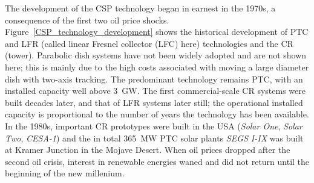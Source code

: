 The development of the \ac{CSP} technology began in earnest in the 1970s, a consequence of the first two oil price shocks. Figure~\ref{CSP_technology_development} shows the historical development of \ac{PTC} and \ac{LFR} (called linear Fresnel collector (LFC) here) technologies and the \ac{CR} (tower). Parabolic dish systems have not been widely adopted and are not shown here; this is mainly due to the high costs associated with moving a large diameter dish with two-axis tracking. The predominant technology remains \ac{PTC}, with an installed capacity well above \SI{3}{GW}. The first commercial-scale \ac{CR} systems were built decades later, and that of \ac{LFR} systems later still; the operational installed capacity is proportional to the number of years the technology has been available. In the 1980s, important \ac{CR} prototypes were built in the USA (\emph{Solar One}, \emph{Solar Two}, \emph{CESA-1}) and the in total \SI{365}{\mega\watt} \ac{PTC} solar plants \emph{SEGS I-IX} was built at Kramer Junction in the Mojave Desert. When oil prices dropped after the second oil crisis, interest in renewable energies waned and did not return until the beginning of the new millenium. 


